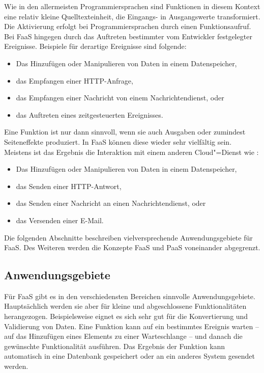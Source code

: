 Wie in den allermeisten Programmiersprachen sind Funktionen in diesem Kontext eine relativ kleine Quelltexteinheit, die Eingangs- in Ausgangswerte transformiert. Die Aktivierung erfolgt bei Programmiersprachen durch einen Funktionsaufruf. Bei FaaS hingegen durch das Auftreten bestimmter vom Entwickler festgelegter Ereignisse. Beispiele für derartige Ereignisse sind folgende:

\begin{itemize}
	\item Das Hinzufügen oder Manipulieren von Daten in einem Datenspeicher,
	\item das Empfangen einer HTTP-Anfrage,
	\item das Empfangen einer Nachricht von einem Nachrichtendienst, oder
	\item das Auftreten eines zeitgesteuerten Ereignisses.
\end{itemize}

Eine Funktion ist nur dann sinnvoll, wenn sie auch Ausgaben oder zumindest Seiteneffekte produziert. In FaaS können diese wieder sehr vielfältig sein. Meistens ist das Ergebnis die Interaktion mit einem anderen Cloud"=Dienst wie \zB:

\begin{itemize}
	\item Das Hinzufügen oder Manipulieren von Daten in einem Datenspeicher,
	\item das Senden einer HTTP-Antwort,
	\item das Senden einer Nachricht an einen Nachrichtendienst, oder
	\item das Versenden einer E-Mail.
\end{itemize}

Die folgenden Abschnitte beschreiben vielversprechende Anwendungsgebiete für FaaS. Des Weiteren werden die Konzepte FaaS und PaaS voneinander abgegrenzt.

\subsection{Anwendungsgebiete}

Für FaaS gibt es in den verschiedensten Bereichen sinnvolle Anwendungsgebiete. Hauptsächlich werden sie aber für kleine und abgeschlossene Funktionalitäten herangezogen. Beispielsweise eignet es sich sehr gut für die Konvertierung und Validierung von Daten. Eine Funktion kann auf ein bestimmtes Ereignis warten -- \zB auf das Hinzufügen eines Elements zu einer Warteschlange -- und danach die gewünschte Funktionalität ausführen. Das Ergebnis der Funktion kann \zB automatisch in eine Datenbank gespeichert oder an ein anderes System gesendet werden.

